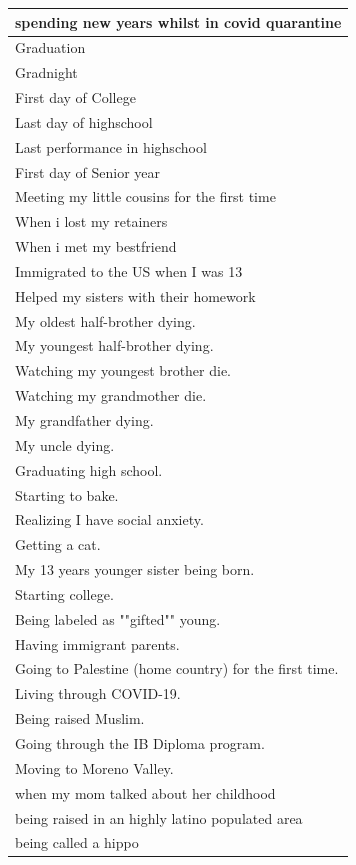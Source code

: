 \documentclass[
  .7em,
  letterpaper,
  DIV=11,
  numbers=noendperiod]{scrartcl}
\begin{document}
\begin{table}
\begin{tabular}{l}
\hline
spending new years whilst in covid quarantine\\
\hline
Graduation\\
\hline
Gradnight\\
\hline
First day of College\\
\hline
Last day of highschool\\
\hline
Last performance in highschool\\
\hline
First day of Senior year\\
\hline
Meeting my little cousins for the first time\\
\hline
When i lost my retainers\\
\hline
When i met my bestfriend\\
\hline
Immigrated to the US when I was 13\\
\hline
Helped my sisters with their homework\\
\hline
My oldest half-brother dying.\\
\hline
My youngest half-brother dying.\\
\hline
Watching my youngest brother die.\\
\hline
Watching my grandmother die.\\
\hline
My grandfather dying.\\
\hline
My uncle dying.\\
\hline
Graduating high school.\\
\hline
Starting to bake.\\
\hline
Realizing I have social anxiety.\\
\hline
Getting a cat.\\
\hline
My 13 years younger sister being born.\\
\hline
Starting college.\\
\hline
Being labeled as ""gifted"" young.\\
\hline
Having immigrant parents.\\
\hline
Going to Palestine (home country) for the first time.\\
\hline
Living through COVID-19.\\
\hline
Being raised Muslim.\\
\hline
Going through the IB Diploma program.\\
\hline
Moving to Moreno Valley.\\
\hline
when my mom talked about her childhood\\
\hline
being raised in an highly latino populated area\\
\hline
being called a hippo\\

\end{tabular}
\end{table}
\end{document}
